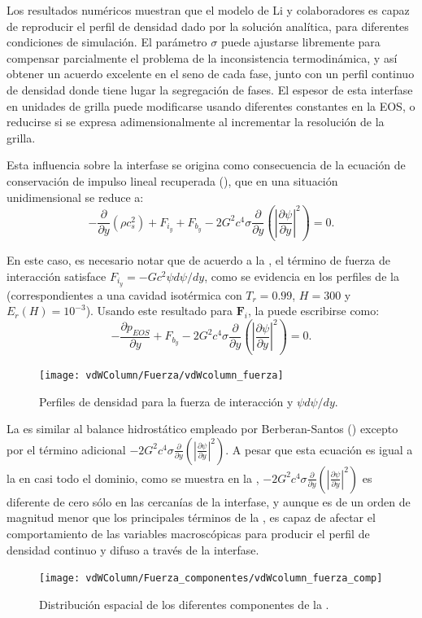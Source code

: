 Los resultados num\'ericos muestran que el modelo \pp{} de Li y colaboradores es capaz de reproducir el perfil de densidad dado por la soluci\'on anal\'itica, para diferentes condiciones de simulaci\'on. El par\'ametro $\sigma$ puede ajustarse libremente para compensar parcialmente el problema de la inconsistencia termodin\'amica, y as\'i obtener un acuerdo excelente en el seno de cada fase, junto con un perfil continuo de densidad donde tiene lugar la segregaci\'on de fases. El espesor de esta interfase en unidades de grilla puede modificarse usando diferentes constantes en la EOS, o reducirse si se expresa adimensionalmente al incrementar la resoluci\'on de la grilla.

Esta influencia sobre la interfase se origina como consecuencia de la ecuaci\'on de conservaci\'on de impulso lineal recuperada (), que en una situaci\'on unidimensional se reduce a:
\begin{equation}
	-\dfrac{\partial}{\partial y}(\rho c_s^2) + F_{i_y} + F_{b_y} - 2 G^2 c^4 \sigma \dfrac{\partial}{\partial y} \left( \left| \dfrac{\partial \psi}{\partial y} \right|^2  \right) = 0.
	\label{eq:li_macro_1d}
\end{equation}


En este caso, es necesario notar que de acuerdo a la , el t\'ermino de fuerza de interacci\'on satisface $F_{i_y} = -Gc^2 \psi d\psi / dy$, como se evidencia en los perfiles de la  (correspondientes a una cavidad isot\'ermica con $T_r = 0.99$, $H=300$ y $E_r(H)=10^{-3}$). Usando este resultado para $\bm{F}_i$, la  puede escribirse como:
\begin{equation}
	-\dfrac{\partial p_{EOS}}{\partial y} + F_{b_y} - 2 G^2 c^4 \sigma \dfrac{\partial}{\partial y} \left( \left| \dfrac{\partial \psi}{\partial y} \right|^2  \right) = 0.
	\label{eq:li_macro_1d_peos}
\end{equation}

\begin{figure}[ht]
	\centering
	\texttt{[image: vdWColumn/Fuerza/vdWcolumn\_fuerza]}
	\caption{Perfiles de densidad para la fuerza de interacci\'on y $\psi d\psi / dy$.}
	\label{fig:vdWColumn_TUniform_fuerza}
\end{figure}

La  es similar al balance hidrost\'atico empleado por Berberan-Santos () excepto por el t\'ermino adicional $- 2 G^2 c^4 \sigma \frac{\partial}{\partial y} \left( \left| \frac{\partial \psi}{\partial y} \right|^2  \right)$. A pesar que esta ecuaci\'on es igual a la  en casi todo el dominio, como se muestra en la , $- 2 G^2 c^4 \sigma \frac{\partial}{\partial y} \left( \left| \frac{\partial \psi}{\partial y} \right|^2  \right)$ es diferente de cero s\'olo en las cercan\'ias de la interfase, y aunque es de un orden de magnitud menor que los principales t\'erminos de la , es capaz de afectar el comportamiento de las variables macrosc\'opicas para producir el perfil de densidad continuo y difuso a trav\'es de la interfase.


\begin{figure}[ht]
	\centering
	\texttt{[image: vdWColumn/Fuerza\_componentes/vdWcolumn\_fuerza\_comp]}
	\caption{Distribuci\'on espacial de los diferentes componentes de la .}
	\label{fig:vdWColumn_fuerza_terminos}
\end{figure}
\FloatBarrier